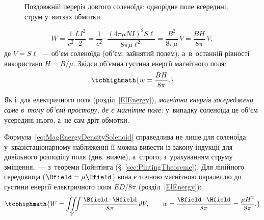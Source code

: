 \begin{figure}\centering
	\caption{Поздовжній переріз довгого соленоїда: однорідне поле всередині, струм
	у~витках обмотки\label{pic:SolenoidCrossSection}}
\end{figure}

\begin{equation*}
	W = \frac1{c^2}\frac{LI^2}2 = \frac1{c^2}\cdot \frac{(4\pi\mu NI)^2 S\ell}{8\pi\mu \ell^2} = \frac{B^2}{8\pi\mu}\, V = \frac{BH}{8\pi}\, V,
\end{equation*}
де $V=S\ell$~--- об'єм соленоїда (об'єм, зайнятий полем), а~в~останній рівності
використано $H=B/\mu$. Звідси об'ємна густина енергії магнітного поля:
\begin{equation}\label{eq:MagEnergyDensitySolenoid}
	\tcbhighmath{
		w = \frac{BH}{8\pi}.
	}
\end{equation}

Як і~для електричного поля (розділ~\ref{ElEnergy}), \emph{магнітна енергія зосереджена саме в~тому об'ємі простору, де є магнітне поле}: у~випадку соленоїда це об'єм усередині нього, а~не сам дріт обмотки.

Формула~\eqref{eq:MagEnergyDensitySolenoid} справедлива не лише для соленоїда: у~квазістаціонарному наближенні її можна вивести
із закону індукції для довільного розподілу поля (див. нижче), а~строго, з~урахуванням струму зміщення,~--- з~теореми
Пойнтінга (\S~\ref{sec:PintingTheoreme}). Для лінійного середовища ($\Bfield=\mu\Hfield$) вона є точною магнітною паралеллю до густини енергії електричного поля $ED/8\pi$ (розділ~\ref{ElEnergy}):
\begin{equation}\label{eq:MagEnergyDensityGeneral}
	\tcbhighmath{
		W = \iiint\limits_V \frac{\Bfield\cdot\Hfield}{8\pi}\, dV, \qquad
		w = \frac{\Bfield\cdot\Hfield}{8\pi} = \frac{\mu H^2}{8\pi}.
	}
\end{equation}



